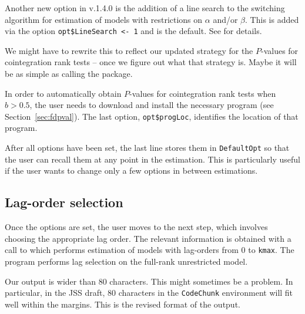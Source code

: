 \documentclass[article]{jss}
\newcommand{\fct}[1]{\code{#1()}}
\begin{document}
Another new option in v.1.4.0 is the addition of a line search to the switching algorithm for estimation of models with restrictions on $\alpha$ and/or $\beta$. This is added via the option \verb|opt$LineSearch <- 1| and is the default. See \citet[Section 2.2]{Doornik2016} for details.

\begin{leftbar}
We might have to rewrite this to reflect our updated strategy for the $P$-values for cointegration rank tests
-- once we figure out what that strategy is. 
Maybe it will be as simple as calling the  package. 
\end{leftbar}

In order to automatically obtain $P$-values for cointegration rank tests when $b>0.5$, the user needs to download and install the necessary program 
(see Section~\ref{sec:fdpval}). 
The last option, \verb|opt$progLoc|, identifies the location of that program.

After all options have been set, the last line 
stores them in \verb|DefaultOpt| so that the user can recall them at any point in the estimation. This is particularly useful if the user wants to change only a few options in between estimations.


\subsection{Lag-order selection}

Once the options are set, the user moves to the next step, which involves choosing the appropriate lag order. The relevant information is obtained with a call to \fct{FCVARlagSelect}
which performs estimation of models with lag-orders from $0$ to \verb|kmax|. The program performs lag selection on the full-rank unrestricted model. 

\begin{leftbar}
Our  output is wider than 80 characters. This might sometimes be a problem. 
In particular, in the JSS draft, 80 characters in the \verb|CodeChunk| environment will fit well within the margins.
This is the revised format of the output.
\end{leftbar}
\end{document}
